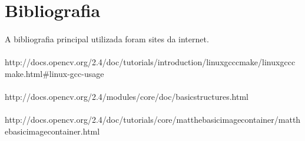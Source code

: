 \documentclass{article}
\begin{document}
	\section{Bibliografia}
	\paragraph{}
	A bibliografia principal utilizada foram sites da internet. \newline
	
	
	\paragraph{}http://docs.opencv.org/2.4/doc/tutorials/introduction/linux\underline{\space}gcc\underline{\space}cmake/linux\underline{\space}gcc\underline{\space}cmake.html\#linux-gcc-usage
	\paragraph{}http://docs.opencv.org/2.4/modules/core/doc/basic\underline{\space}structures.html
	\paragraph{}http://docs.opencv.org/2.4/doc/tutorials/core/mat\underline{\space}the\underline{\space}basic\underline{\space}image\underline{\space}container/mat\underline{\space}the\underline{\space}basic\underline{\space}image\underline{\space}container.html
	

	
\end{document}
